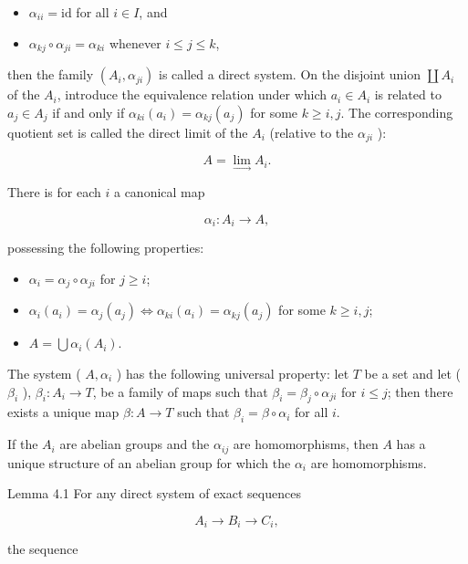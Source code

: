 \documentclass[10pt]{article}
\begin{document}
\begin{itemize}
  \item[(a)] $\alpha_{i i}=\mathrm{id}$ for all $i \in I$, and
  \item[(b)] $\alpha_{k j} \circ \alpha_{j i}=\alpha_{k i}$ whenever $i \leq j \leq k$,
\end{itemize}

then the family $\left(A_{i}, \alpha_{j i}\right)$ is called a direct system. On the disjoint union $\coprod A_{i}$ of the $A_{i}$, introduce the equivalence relation under which $a_{i} \in A_{i}$ is related to $a_{j} \in A_{j}$ if and only if $\alpha_{k i}\left(a_{i}\right)=\alpha_{k j}\left(a_{j}\right)$ for some $k \geq i, j$. The corresponding quotient set is called the direct limit of the $A_{i}$ (relative to the $\alpha_{j i}$ ):

$$
A=\underset{\longrightarrow}{\lim } A_{i} .
$$

There is for each $i$ a canonical map

$$
\alpha_{i}: A_{i} \rightarrow A,
$$

possessing the following properties:

\begin{itemize}
  \item[(a)] $\alpha_{i}=\alpha_{j} \circ \alpha_{j i}$ for $j \geq i$;
  \item[(b)] $\alpha_{i}\left(a_{i}\right)=\alpha_{j}\left(a_{j}\right) \Longleftrightarrow \alpha_{k i}\left(a_{i}\right)=\alpha_{k j}\left(a_{j}\right)$ for some $k \geq i, j$;
  \item[(c)] $A=\bigcup \alpha_{i}\left(A_{i}\right)$.
\end{itemize}

The system ( $A, \alpha_{i}$ ) has the following universal property: let $T$ be a set and let ( $\beta_{i}$ ), $\beta_{i}: A_{i} \rightarrow T$, be a family of maps such that $\beta_{i}=\beta_{j} \circ \alpha_{j i}$ for $i \leq j$; then there exists a unique map $\beta: A \rightarrow T$ such that $\beta_{i}=\beta \circ \alpha_{i}$ for all $i$.

If the $A_{i}$ are abelian groups and the $\alpha_{i j}$ are homomorphisms, then $A$ has a unique structure of an abelian group for which the $\alpha_{i}$ are homomorphisms.

Lemma 4.1 For any direct system of exact sequences

$$
A_{i} \rightarrow B_{i} \rightarrow C_{i},
$$

the sequence
\end{document}
